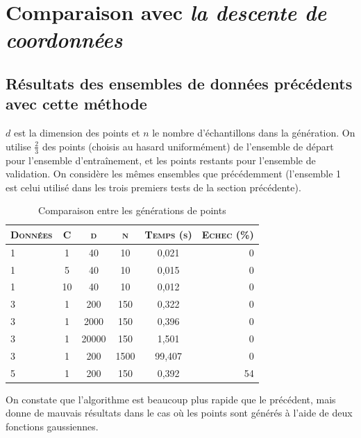 \documentclass{article}
\begin{document}
\section{Comparaison avec \emph{la descente de coordonnées}}

\subsection{Résultats des ensembles de données précédents avec cette méthode}

$d$ est la dimension des points et $n$ le nombre d'échantillons dans la génération. On utilise $\frac{2}{3}$ des points (choisis au hasard uniformément) de l'ensemble de départ pour l'ensemble d'entraînement, et les points restants pour l'ensemble de validation. On considère les mêmes ensembles que précédemment (l'ensemble 1 est celui utilisé dans les trois premiers tests de la section précédente).\\

     \begin{table}[H]
       \caption{Comparaison entre les générations de points}
       \begin{tabular}{|l|c|c|c|c|r|}
         \hline
         \textsc{Données} & \textsc{C} & \textsc{d} & \textsc{n} & \textsc{Temps (s)} & \textsc{Echec (\%)}\\
         \hline
         1 & 1 & 40 & 10 & 0,021 & 0\\
         \hline
         1 & 5 & 40 & 10 & 0,015 & 0\\
         \hline
         1 & 10 & 40 & 10 & 0,012 & 0\\
         \hline
         3 & 1 & 200 & 150 & 0,322 & 0\\
         \hline
         3 & 1 & 2000 & 150 & 0,396 & 0\\
         \hline
         3 & 1 & 20000 & 150 & 1,501 & 0\\
         \hline
         3 & 1 & 200 & 1500 & 99,407 & 0\\
         \hline
         5 & 1 & 200 & 150 & 0,392 & 54\\
         \hline
       \end{tabular}
     \end{table}

On constate que l'algorithme est beaucoup plus rapide que le précédent, mais donne de mauvais résultats dans le cas où les points sont générés à l'aide de deux fonctions gaussiennes.\\
\end{document}
